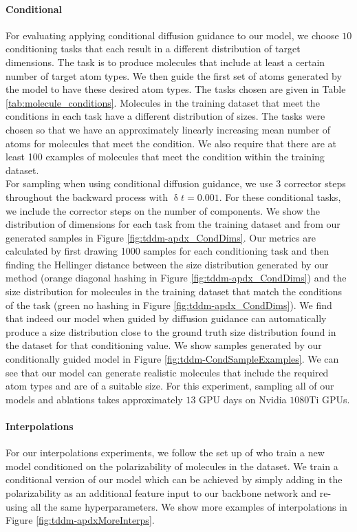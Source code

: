 \paragraph{Conditional}
For evaluating applying conditional diffusion guidance to our model, we choose $10$ conditioning tasks that each result in a different distribution of target dimensions. The task is to produce molecules that include at least a certain number of target atom types. We then guide the first set of atoms generated by the model to have these desired atom types. The tasks chosen are given in Table \ref{tab:molecule_conditions}. Molecules in the training dataset that meet the conditions in each task have a different distribution of sizes. The tasks were chosen so that we have an approximately linearly increasing mean number of atoms for molecules that meet the condition. We also require that there are at least 100 examples of molecules that meet the condition within the training dataset.\\

For sampling when using conditional diffusion guidance, we use $3$ corrector steps throughout the backward process with $\updelta t = 0.001$. For these conditional tasks, we include the corrector steps on the number of components. We show the distribution of dimensions for each task from the training dataset and from our generated samples in Figure \ref{fig:tddm-apdx_CondDims}. Our metrics are calculated by first drawing 1000 samples for each conditioning task and then finding the Hellinger distance between the size distribution generated by our method (orange diagonal hashing in Figure \ref{fig:tddm-apdx_CondDims}) and the size distribution for molecules in the training dataset that match the conditions of the task (green no hashing in Figure \ref{fig:tddm-apdx_CondDims}). We find that indeed our model when guided by diffusion guidance can automatically produce a size distribution close to the ground truth size distribution found in the dataset for that conditioning value. We show samples generated by our conditionally guided model in Figure \ref{fig:tddm-CondSampleExamples}. We can see that our model can generate realistic molecules that include the required atom types and are of a suitable size. For this experiment, sampling all of our models and ablations takes approximately $13$ GPU days on Nvidia $1080$Ti GPUs.

\paragraph{Interpolations}
For our interpolations experiments, we follow the set up of \cite{hoogeboom2022equivariant} who train a new model conditioned on the polarizability of molecules in the dataset. We train a conditional version of our model which can be achieved by simply adding in the polarizability as an additional feature input to our backbone network and re-using all the same hyperparameters. We show more examples of interpolations in Figure \ref{fig:tddm-apdxMoreInterps}.


